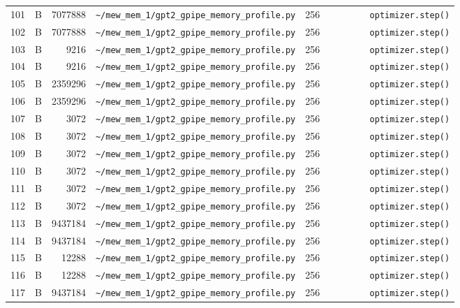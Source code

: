\documentclass{article}
\begin{document}
\begin{longtable}{r l r p{6.5cm} r p{7.0cm}}
101 & B & 7077888 & \lstinline|~/mew_mem_1/gpt2_gpipe_memory_profile.py| & 256 & \lstinline|        optimizer.step()| \\
102 & B & 7077888 & \lstinline|~/mew_mem_1/gpt2_gpipe_memory_profile.py| & 256 & \lstinline|        optimizer.step()| \\
103 & B & 9216 & \lstinline|~/mew_mem_1/gpt2_gpipe_memory_profile.py| & 256 & \lstinline|        optimizer.step()| \\
104 & B & 9216 & \lstinline|~/mew_mem_1/gpt2_gpipe_memory_profile.py| & 256 & \lstinline|        optimizer.step()| \\
105 & B & 2359296 & \lstinline|~/mew_mem_1/gpt2_gpipe_memory_profile.py| & 256 & \lstinline|        optimizer.step()| \\
106 & B & 2359296 & \lstinline|~/mew_mem_1/gpt2_gpipe_memory_profile.py| & 256 & \lstinline|        optimizer.step()| \\
107 & B & 3072 & \lstinline|~/mew_mem_1/gpt2_gpipe_memory_profile.py| & 256 & \lstinline|        optimizer.step()| \\
108 & B & 3072 & \lstinline|~/mew_mem_1/gpt2_gpipe_memory_profile.py| & 256 & \lstinline|        optimizer.step()| \\
109 & B & 3072 & \lstinline|~/mew_mem_1/gpt2_gpipe_memory_profile.py| & 256 & \lstinline|        optimizer.step()| \\
110 & B & 3072 & \lstinline|~/mew_mem_1/gpt2_gpipe_memory_profile.py| & 256 & \lstinline|        optimizer.step()| \\
111 & B & 3072 & \lstinline|~/mew_mem_1/gpt2_gpipe_memory_profile.py| & 256 & \lstinline|        optimizer.step()| \\
112 & B & 3072 & \lstinline|~/mew_mem_1/gpt2_gpipe_memory_profile.py| & 256 & \lstinline|        optimizer.step()| \\
113 & B & 9437184 & \lstinline|~/mew_mem_1/gpt2_gpipe_memory_profile.py| & 256 & \lstinline|        optimizer.step()| \\
114 & B & 9437184 & \lstinline|~/mew_mem_1/gpt2_gpipe_memory_profile.py| & 256 & \lstinline|        optimizer.step()| \\
115 & B & 12288 & \lstinline|~/mew_mem_1/gpt2_gpipe_memory_profile.py| & 256 & \lstinline|        optimizer.step()| \\
116 & B & 12288 & \lstinline|~/mew_mem_1/gpt2_gpipe_memory_profile.py| & 256 & \lstinline|        optimizer.step()| \\
117 & B & 9437184 & \lstinline|~/mew_mem_1/gpt2_gpipe_memory_profile.py| & 256 & \lstinline|        optimizer.step()| \\

\end{longtable}
\end{document}
